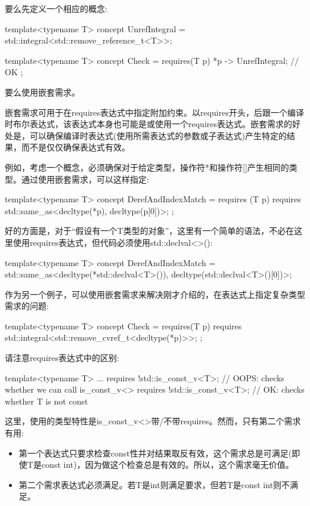 要么先定义一个相应的概念:

\begin{cpp}
template<typename T>
concept UnrefIntegral = std::integral<std::remove_reference_t<T>>;

template<typename T>
concept Check = requires(T p) {
	{ *p } -> UnrefIntegral; // OK
};
\end{cpp}

要么使用嵌套需求。


嵌套需求可用于在requires表达式中指定附加约束。以requires开头，后跟一个编译时布尔表达式，该表达式本身也可能是或使用一个requires表达式。嵌套需求的好处是，可以确保编译时表达式(使用所需表达式的参数或子表达式)产生特定的结果，而不是仅仅确保表达式有效。

例如，考虑一个概念，必须确保对于给定类型，操作符*和操作符[]产生相同的类型。通过使用嵌套需求，可以这样指定:

\begin{cpp}
template<typename T>
concept DerefAndIndexMatch = requires (T p) {
								requires std::same_as<decltype(*p),
										decltype(p[0])>;
							};
\end{cpp}

好的方面是，对于“假设有一个T类型的对象”，这里有一个简单的语法，不必在这里使用requires表达式，但代码必须使用std::declval<>():

\begin{cpp}
template<typename T>
concept DerefAndIndexMatch = std::same_as<decltype(*std::declval<T>()),
			 decltype(std::declval<T>()[0])>;
\end{cpp}

作为另一个例子，可以使用嵌套需求来解决刚才介绍的，在表达式上指定复杂类型需求的问题:

\begin{cpp}
template<typename T>
concept Check = requires(T p) {
	requires std::integral<std::remove_cvref_t<decltype(*p)>>;
};
\end{cpp}

请注意requires表达式中的区别:

\begin{cpp}
template<typename T>
... requires {
	!std::is_const_v<T>; // OOPS: checks whether we can call is_const_v<>
	requires !std::is_const_v<T>; // OK: checks whether T is not const
}
\end{cpp}

这里，使用的类型特性是is\_const\_v<>带/不带requires。然而，只有第二个需求有用:

\begin{itemize}
\item
第一个表达式只要求检查const性并对结果取反有效，这个需求总是可满足(即使T是const int)，因为做这个检查总是有效的。所以，这个需求毫无价值。

\item
第二个需求表达式必须满足。若T是int则满足要求，但若T是const int则不满足。
\end{itemize}

